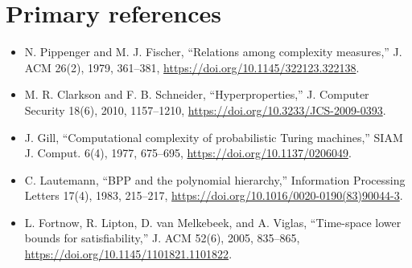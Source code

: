 \documentclass[11pt]{article}
\begin{document}
\section*{Primary references}
\begin{itemize}
\item N. Pippenger and M. J. Fischer, ``Relations among complexity measures,''
J. ACM 26(2), 1979, 361--381, \url{https://doi.org/10.1145/322123.322138}.
\item M. R. Clarkson and F. B. Schneider, ``Hyperproperties,'' J. Computer
Security 18(6), 2010, 1157--1210, \url{https://doi.org/10.3233/JCS-2009-0393}.
\item J. Gill, ``Computational complexity of probabilistic Turing machines,''
SIAM J. Comput. 6(4), 1977, 675--695,
\url{https://doi.org/10.1137/0206049}.
\item C. Lautemann, ``BPP and the polynomial hierarchy,'' Information
Processing Letters 17(4), 1983, 215--217,
\url{https://doi.org/10.1016/0020-0190(83)90044-3}.
\item L. Fortnow, R. Lipton, D. van Melkebeek, and A. Viglas,
``Time-space lower bounds for satisfiability,'' J. ACM 52(6), 2005, 835--865,
\url{https://doi.org/10.1145/1101821.1101822}.
\end{itemize}

\end{document}

